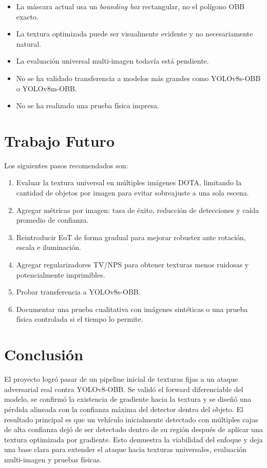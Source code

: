 \documentclass[12pt,a4paper]{article}
\begin{document}
\begin{itemize}
    \item La máscara actual usa un \textit{bounding box} rectangular, no el polígono OBB exacto.
    \item La textura optimizada puede ser visualmente evidente y no necesariamente natural.
    \item La evaluación universal multi-imagen todavía está pendiente.
    \item No se ha validado transferencia a modelos más grandes como YOLOv8s-OBB o YOLOv8m-OBB.
    \item No se ha realizado una prueba física impresa.
\end{itemize}

\section{Trabajo Futuro}

Los siguientes pasos recomendados son:

\begin{enumerate}
    \item Evaluar la textura universal en múltiples imágenes DOTA, limitando la cantidad de objetos por imagen para evitar sobreajuste a una sola escena.
    \item Agregar métricas por imagen: tasa de éxito, reducción de detecciones y caída promedio de confianza.
    \item Reintroducir EoT de forma gradual para mejorar robustez ante rotación, escala e iluminación.
    \item Agregar regularizadores TV/NPS para obtener texturas menos ruidosas y potencialmente imprimibles.
    \item Probar transferencia a YOLOv8s-OBB.
    \item Documentar una prueba cualitativa con imágenes sintéticas o una prueba física controlada si el tiempo lo permite.
\end{enumerate}

\section{Conclusión}

El proyecto logró pasar de un pipeline inicial de texturas fijas a un ataque adversarial real contra YOLOv8-OBB. Se validó el forward diferenciable del modelo, se confirmó la existencia de gradiente hacia la textura y se diseñó una pérdida alineada con la confianza máxima del detector dentro del objeto. El resultado principal es que un vehículo inicialmente detectado con múltiples cajas de alta confianza dejó de ser detectado dentro de su región después de aplicar una textura optimizada por gradiente. Esto demuestra la viabilidad del enfoque y deja una base clara para extender el ataque hacia texturas universales, evaluación multi-imagen y pruebas físicas.



\end{document}
